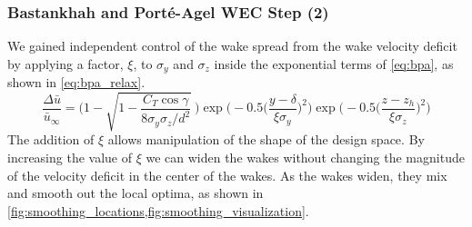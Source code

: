 \documentclass[a4paper]{jpconf}
\begin{document}
\subsubsection{Bastankhah and Port\'e-Agel WEC Step (2)}
We gained independent control of the wake spread from the wake velocity deficit by applying a factor, $\xi$, to $\sigma_y$ and $\sigma_z$ inside the exponential terms of \cref{eq:bpa}, as shown in \cref{eq:bpa_relax}.
\begin{equation}
	\frac{\Delta \bar{u}}{\bar{u}_{\infty}} = \Bigg(1-\sqrt{1-\frac{C_T \cos{\gamma}}{8 \sigma_y \sigma_z/d^2}}~\Bigg) \exp{\bigg(-0.5\Big(\frac{y-\delta}{\xi \sigma_y}\Big)^2\bigg)}\exp{\bigg(-0.5\Big(\frac{z-z_h}{\xi \sigma_z}\Big)^2\bigg)}
\label{eq:bpa_relax}
\end{equation}
The addition of $\xi$ allows manipulation of the shape of the design space. By increasing the value of $\xi$ we can widen the wakes without changing the magnitude of the velocity deficit in the center of the wakes. As the wakes widen, they mix and smooth out the local optima, as shown in \cref{fig:smoothing_locations,fig:smoothing_visualization}. 
%
\end{document}
